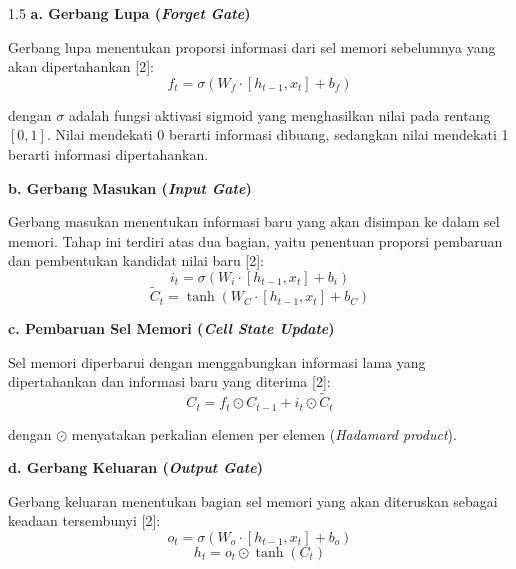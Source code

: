 \documentclass[12pt, a4paper, onecolumn, oneside]{report}
\begin{document}
\begin{spacing}{1.5}
\noindent\textbf{a. Gerbang Lupa (\textit{Forget Gate})}

Gerbang lupa menentukan proporsi informasi dari sel memori sebelumnya yang akan dipertahankan [2]:
\begin{equation}
    f_t = \sigma(W_f \cdot [h_{t-1}, x_t] + b_f)
    \label{eq:gerbang-lupa}
\end{equation}

\noindent dengan $\sigma$ adalah fungsi aktivasi sigmoid yang menghasilkan nilai pada rentang $[0, 1]$. Nilai mendekati 0 berarti informasi dibuang, sedangkan nilai mendekati 1 berarti informasi dipertahankan.

\noindent\textbf{b. Gerbang Masukan (\textit{Input Gate})}

Gerbang masukan menentukan informasi baru yang akan disimpan ke dalam sel memori. Tahap ini terdiri atas dua bagian, yaitu penentuan proporsi pembaruan dan pembentukan kandidat nilai baru [2]:
\begin{equation}
    i_t = \sigma(W_i \cdot [h_{t-1}, x_t] + b_i)
    \label{eq:gerbang-masukan}
\end{equation}
\begin{equation}
    \tilde{C}_t = \tanh(W_C \cdot [h_{t-1}, x_t] + b_C)
    \label{eq:kandidat-sel}
\end{equation}

\noindent\textbf{c. Pembaruan Sel Memori (\textit{Cell State Update})}

Sel memori diperbarui dengan menggabungkan informasi lama yang dipertahankan dan informasi baru yang diterima [2]:
\begin{equation}
    C_t = f_t \odot C_{t-1} + i_t \odot \tilde{C}_t
    \label{eq:pembaruan-sel}
\end{equation}

\noindent dengan $\odot$ menyatakan perkalian elemen per elemen (\textit{Hadamard product}).

\noindent\textbf{d. Gerbang Keluaran (\textit{Output Gate})}

Gerbang keluaran menentukan bagian sel memori yang akan diteruskan sebagai keadaan tersembunyi [2]:
\begin{equation}
    o_t = \sigma(W_o \cdot [h_{t-1}, x_t] + b_o)
    \label{eq:gerbang-keluaran}
\end{equation}
\begin{equation}
    h_t = o_t \odot \tanh(C_t)
    \label{eq:keadaan-tersembunyi}
\end{equation}


\end{spacing}
\end{document}
